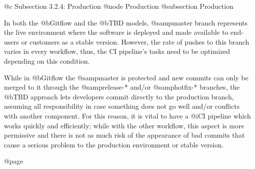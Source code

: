 @c Subsection 3.2.4: Production
@node Production
@subsection Production

In both the @b{Gitflow} and the @b{TBD} models, @samp{master} branch represents the live environment where the software is deployed and made available to end-users or customers as a stable version. However, the rate of pushes to this branch varies in every workflow, thus, the CI pipeline's tasks need to be optimized depending on this condition.

While in @b{Gitflow} the @samp{master} is protected and new commits can only be merged to it through the @samp{release-*} and/or @samp{hotfix-*} branches, the @b{TBD} approach lets developers commit directly to the production branch, assuming all responsibility in case something does not go well and/or conflicts with another component. For this reason, it is vital to have a @i{CI pipeline} which works quickly and efficiently; while with the other workflow, this aspect is more permissive and there is not as much risk of the appearance of bad commits that cause a serious problem to the production environment or stable version.

@page
